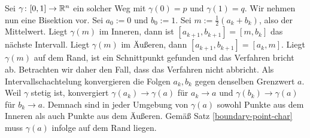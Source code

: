 \begin{Beweis}[Beweis 2]
Sei $\gamma\colon [0,1]\to\mathbb R^n$ ein solcher Weg mit $\gamma(0)=p$ und
$\gamma(1)=q$. Wir nehmen nun eine Bisektion vor. Sei $a_0:=0$ und
$b_0:=1$. Sei $m:=\tfrac{1}{2}(a_{k}+b_{k})$, also der Mittelwert. Liegt
$\gamma(m)$ im Inneren, dann ist $[a_{k+1},b_{k+1}]=[m,b_k]$ das nächste
Intervall. Liegt $\gamma(m)$ im Äußeren, dann $[a_{k+1},b_{k+1}]=[a_k,m]$.
Liegt $\gamma(m)$ auf dem Rand, ist ein Schnittpunkt gefunden und
das Verfahren bricht ab. Betrachten wir daher
den Fall, dass das Verfahren nicht abbricht. Als
Intervallschachtelung konvergieren die Folgen $a_k,b_k$ gegen
denselben Grenzwert $a$. Weil $\gamma$ stetig ist, konvergiert
$\gamma(a_k)\to \gamma(a)$ für $a_k\to a$ und $\gamma(b_k)\to\gamma(a)$
für $b_k\to a$. Demnach sind in jeder Umgebung von $\gamma(a)$ sowohl
Punkte aus dem Inneren als auch Punkte aus dem Äußeren. Gemäß
Satz \ref{boundary-point-char} muss $\gamma(a)$ infolge
auf dem Rand liegen.\,\qedsymbol
\end{Beweis}
